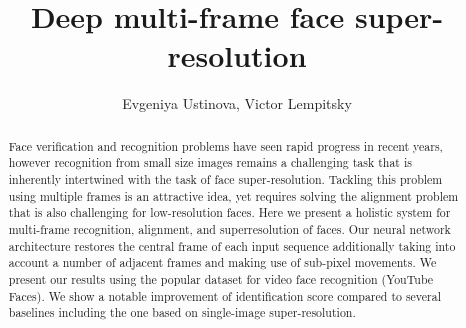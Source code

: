 \documentclass[10pt,twocolumn,letterpaper]{article}
\title{Deep multi-frame face super-resolution}
\author{Evgeniya Ustinova, Victor Lempitsky}
\begin{document}
\maketitle


\begin{abstract}
Face verification and recognition problems have seen rapid progress in recent years, however recognition from small size images remains a challenging task that is inherently intertwined with the task of face super-resolution. Tackling this problem using multiple frames is an attractive idea, yet requires solving the alignment problem that is also challenging for low-resolution faces. Here we present a holistic system for multi-frame recognition, alignment, and superresolution of faces. Our neural network architecture restores the central frame of each input sequence additionally taking into account a number of adjacent frames and making use of sub-pixel movements. We present our results using the popular dataset for video face recognition (YouTube Faces). We show a notable improvement of identification score compared to several baselines including the one based on single-image super-resolution.
\end{abstract}










\medskip
 
\printbibliography
\end{document}
